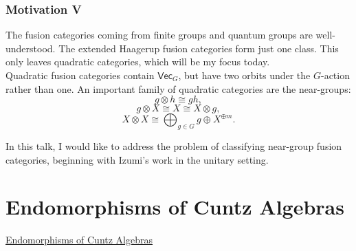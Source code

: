 \documentclass{beamer}
\newcommand{\textcat}[1]{\mathrm{\textsf{#1}}}
\begin{document}
\begin{frame}
\frametitle{Motivation V}
The fusion categories coming from finite groups and quantum groups are well-understood. The extended Haagerup fusion categories form just one class. This only leaves \textcolor{structure}{quadratic categories}, which will be my focus today.\\[2ex]

\textcolor{structure}{Quadratic fusion categories} contain $\textcat{Vec}_G$, but have two orbits under the $G$-action rather than one. An important family of quadratic categories are the \textcolor{structure}{near-groups}:%
\[
g \otimes h \cong gh,
\]
\[
g \otimes X \cong X \cong X \otimes g,
\]
\[
X \otimes X \cong \bigoplus_{g \in G}g \oplus X^{\oplus m}.
\]

In this talk, I would like to address the problem of classifying \textcolor{structure}{near-group fusion categories}, beginning with Izumi's work in the unitary setting.
\end{frame}


\section{Endomorphisms of Cuntz Algebras}

\begin{frame}
\noindent\centerline{\LARGE\textcolor{structure}{\underline{Endomorphisms of Cuntz Algebras}}}
\end{frame}

\end{document}
